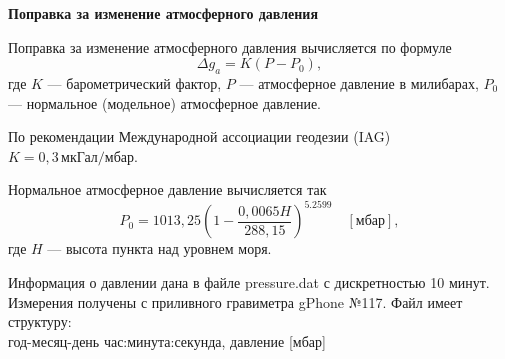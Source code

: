 \documentclass[11pt, a4paper,addpoints]{exam}
\theoremstyle{remark}
\begin{document}
\begin{flushleft}
    \textbf{Поправка за изменение атмосферного давления} 
\end{flushleft}

Поправка за изменение атмосферного давления вычисляется по формуле
\begin{equation*}
    \Delta g_a = K \left( P - P_0 \right),
\end{equation*}
где $K$ --- барометрический фактор, $P$ --- атмосферное давление в милибарах, $P_0$ --- нормальное
(модельное) атмосферное давление.

По рекомендации Международной ассоциации геодезии (IAG) $K = 0,3\, \text{мкГал/мбар}$.

Нормальное атмосферное давление вычисляется так
\begin{equation*}
    P_0 = 1013,25 \left( 1 - \dfrac{0,0065 H}{288,15} \right)^{5.2599}\quad[\text{мбар}],
\end{equation*}
где $H$ --- высота пункта над уровнем моря.

Информация о давлении дана в файле \textrm{pressure.dat} с дискретностью 10 минут. Измерения
получены с приливного гравиметра gPhone №117. Файл имеет структуру:\\
год-месяц-день час:минута:секунда, давление [мбар]\\

\end{document}
